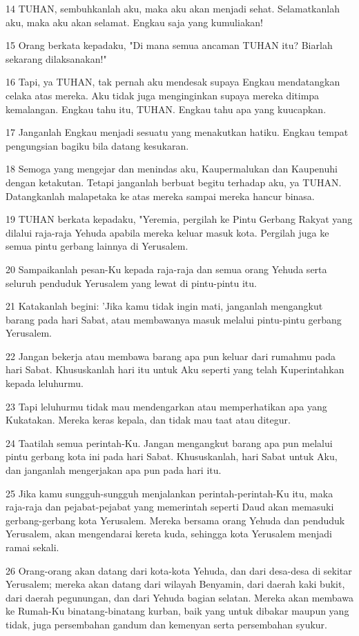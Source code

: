 \par 14 TUHAN, sembuhkanlah aku, maka aku akan menjadi sehat. Selamatkanlah aku, maka aku akan selamat. Engkau saja yang kumuliakan!
\par 15 Orang berkata kepadaku, "Di mana semua ancaman TUHAN itu? Biarlah sekarang dilaksanakan!"
\par 16 Tapi, ya TUHAN, tak pernah aku mendesak supaya Engkau mendatangkan celaka atas mereka. Aku tidak juga menginginkan supaya mereka ditimpa kemalangan. Engkau tahu itu, TUHAN. Engkau tahu apa yang kuucapkan.
\par 17 Janganlah Engkau menjadi sesuatu yang menakutkan hatiku. Engkau tempat pengungsian bagiku bila datang kesukaran.
\par 18 Semoga yang mengejar dan menindas aku, Kaupermalukan dan Kaupenuhi dengan ketakutan. Tetapi janganlah berbuat begitu terhadap aku, ya TUHAN. Datangkanlah malapetaka ke atas mereka sampai mereka hancur binasa.
\par 19 TUHAN berkata kepadaku, "Yeremia, pergilah ke Pintu Gerbang Rakyat yang dilalui raja-raja Yehuda apabila mereka keluar masuk kota. Pergilah juga ke semua pintu gerbang lainnya di Yerusalem.
\par 20 Sampaikanlah pesan-Ku kepada raja-raja dan semua orang Yehuda serta seluruh penduduk Yerusalem yang lewat di pintu-pintu itu.
\par 21 Katakanlah begini: 'Jika kamu tidak ingin mati, janganlah mengangkut barang pada hari Sabat, atau membawanya masuk melalui pintu-pintu gerbang Yerusalem.
\par 22 Jangan bekerja atau membawa barang apa pun keluar dari rumahmu pada hari Sabat. Khususkanlah hari itu untuk Aku seperti yang telah Kuperintahkan kepada leluhurmu.
\par 23 Tapi leluhurmu tidak mau mendengarkan atau memperhatikan apa yang Kukatakan. Mereka keras kepala, dan tidak mau taat atau ditegur.
\par 24 Taatilah semua perintah-Ku. Jangan mengangkut barang apa pun melalui pintu gerbang kota ini pada hari Sabat. Khususkanlah, hari Sabat untuk Aku, dan janganlah mengerjakan apa pun pada hari itu.
\par 25 Jika kamu sungguh-sungguh menjalankan perintah-perintah-Ku itu, maka raja-raja dan pejabat-pejabat yang memerintah seperti Daud akan memasuki gerbang-gerbang kota Yerusalem. Mereka bersama orang Yehuda dan penduduk Yerusalem, akan mengendarai kereta kuda, sehingga kota Yerusalem menjadi ramai sekali.
\par 26 Orang-orang akan datang dari kota-kota Yehuda, dan dari desa-desa di sekitar Yerusalem; mereka akan datang dari wilayah Benyamin, dari daerah kaki bukit, dari daerah pegunungan, dan dari Yehuda bagian selatan. Mereka akan membawa ke Rumah-Ku binatang-binatang kurban, baik yang untuk dibakar maupun yang tidak, juga persembahan gandum dan kemenyan serta persembahan syukur.
